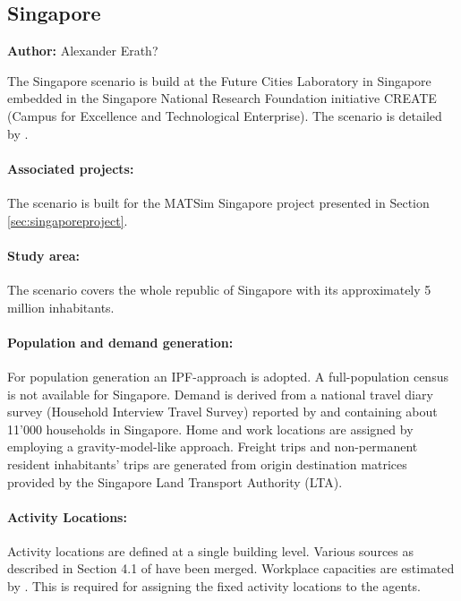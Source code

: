 \subsection{Singapore}
\label{ch:scenarios:singapore}
\hfill \textbf{Author:} Alexander Erath?

The Singapore scenario is build at the Future Cities Laboratory in Singapore embedded in the Singapore National Research Foundation initiative CREATE (Campus for Excellence and Technological Enterprise). The scenario is detailed by \citet[][]{ErathEtAl_TechRep_FCL_forth, Erath_unpub_UniSeoul_2011}.

\paragraph{Associated projects:} 
The scenario is built for the MATSim Singapore project presented in Section \ref{sec:singaporeproject}.

\paragraph{Study area:} 
The scenario covers the whole republic of Singapore with its approximately 5 million inhabitants.

\paragraph{Population and demand generation:} 
For population generation an IPF-approach is adopted. A full-population census is not available for Singapore. Demand is derived from a national travel diary survey (Household Interview Travel Survey) reported by \citet[][]{Choi_JOUR_2010} and containing about 11'000 households in Singapore. Home and work locations are assigned by employing a gravity-model-like approach. Freight trips and non-permanent resident inhabitants' trips are generated from origin destination matrices provided by the Singapore Land Transport Authority (LTA).

\paragraph{Activity Locations:} 
Activity locations are defined at a single building level. Various sources as described in Section 4.1 of \citet[][]{ErathEtAl_TechRep_FCL_forth} have been merged. Workplace capacities are estimated by \citet[][]{OrdonezErath_TRR_2013}. This is required for assigning the fixed activity locations to the agents.

